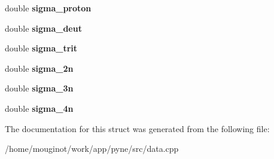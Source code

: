 \begin{DoxyCompactItemize}
double {\bfseries sigma\+\_\+proton}
\item 
\mbox{\label{structsimple__xs_a144a201fa75999fe72b1e7ff6cf599de}} 
double {\bfseries sigma\+\_\+deut}
\item 
\mbox{\label{structsimple__xs_ac94cd1b3c4d07c830484563268c9e3b4}} 
double {\bfseries sigma\+\_\+trit}
\item 
\mbox{\label{structsimple__xs_a48428459c08bd8e7ca73ede3d5d1b12d}} 
double {\bfseries sigma\+\_\+2n}
\item 
\mbox{\label{structsimple__xs_a2d20b02fe8098c55466d12de065bfdee}} 
double {\bfseries sigma\+\_\+3n}
\item 
\mbox{\label{structsimple__xs_a1c2a32a82a8f3e381d67b778c89c499e}} 
double {\bfseries sigma\+\_\+4n}
\end{DoxyCompactItemize}


The documentation for this struct was generated from the following file\+:\begin{DoxyCompactItemize}
\item 
/home/mouginot/work/app/pyne/src/data.\+cpp\end{DoxyCompactItemize}
